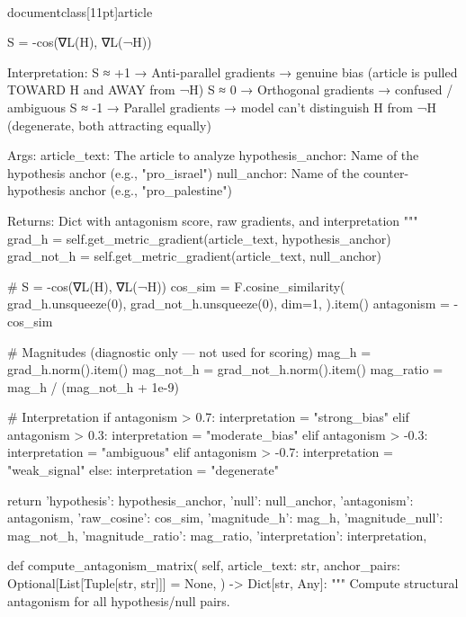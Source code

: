 \\documentclass[11pt]{article}
\begin{document}
\begin{CodeBlock}
            S = -cos(∇L(H), ∇L(¬H))

        Interpretation:
            S ≈ +1  → Anti-parallel gradients → genuine bias (article is
                      pulled TOWARD H and AWAY from ¬H)
            S ≈  0  → Orthogonal gradients → confused / ambiguous
            S ≈ -1  → Parallel gradients → model can't distinguish H from ¬H
                      (degenerate, both attracting equally)

        Args:
            article_text: The article to analyze
            hypothesis_anchor: Name of the hypothesis anchor (e.g., "pro_israel")
            null_anchor: Name of the counter-hypothesis anchor (e.g., "pro_palestine")

        Returns:
            Dict with antagonism score, raw gradients, and interpretation
        """
        grad_h = self.get_metric_gradient(article_text, hypothesis_anchor)
        grad_not_h = self.get_metric_gradient(article_text, null_anchor)

        # S = -cos(∇L(H), ∇L(¬H))
        cos_sim = F.cosine_similarity(
            grad_h.unsqueeze(0),
            grad_not_h.unsqueeze(0),
            dim=1,
        ).item()
        antagonism = -cos_sim

        # Magnitudes (diagnostic only — not used for scoring)
        mag_h = grad_h.norm().item()
        mag_not_h = grad_not_h.norm().item()
        mag_ratio = mag_h / (mag_not_h + 1e-9)

        # Interpretation
        if antagonism > 0.7:
            interpretation = "strong_bias"
        elif antagonism > 0.3:
            interpretation = "moderate_bias"
        elif antagonism > -0.3:
            interpretation = "ambiguous"
        elif antagonism > -0.7:
            interpretation = "weak_signal"
        else:
            interpretation = "degenerate"

        return {
            'hypothesis': hypothesis_anchor,
            'null': null_anchor,
            'antagonism': antagonism,
            'raw_cosine': cos_sim,
            'magnitude_h': mag_h,
            'magnitude_null': mag_not_h,
            'magnitude_ratio': mag_ratio,
            'interpretation': interpretation,
        }

    def compute_antagonism_matrix(
        self,
        article_text: str,
        anchor_pairs: Optional[List[Tuple[str, str]]] = None,
    ) -> Dict[str, Any]:
        """
        Compute structural antagonism for all hypothesis/null pairs.


\end{CodeBlock}
\end{document}
